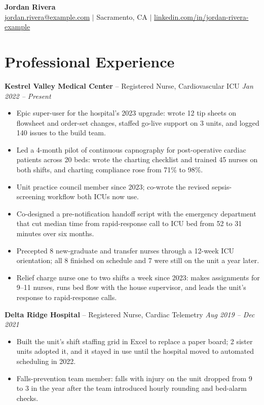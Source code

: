 \documentclass[11pt, letterpaper]{article}
\begin{document}
\pagestyle{empty}

\begin{center}
  \textbf{\LARGE Jordan Rivera} \\[2pt]
  \href{mailto:jordan.rivera@example.com}{jordan.rivera@example.com} $|$ Sacramento, CA $|$ \href{https://linkedin.com/in/jordan-rivera-example}{linkedin.com/in/jordan-rivera-example}
\end{center}
\vspace{-15pt}

\section{Professional Experience}

\textbf{Kestrel Valley Medical Center} -- {Registered Nurse, Cardiovascular ICU}
\hfill \textit{Jan 2022 – Present}
\begin{itemize}
  \item Epic super-user for the hospital's 2023 upgrade: wrote 12 tip sheets on flowsheet and order-set changes, staffed go-live support on 3 units, and logged 140 issues to the build team.
  \item Led a 4-month pilot of continuous capnography for post-operative cardiac patients across 20 beds: wrote the charting checklist and trained 45 nurses on both shifts, and charting compliance rose from 71\% to 98\%.
  \item Unit practice council member since 2023; co-wrote the revised sepsis-screening workflow both ICUs now use.
  \item Co-designed a pre-notification handoff script with the emergency department that cut median time from rapid-response call to ICU bed from 52 to 31 minutes over six months.
  \item Precepted 8 new-graduate and transfer nurses through a 12-week ICU orientation; all 8 finished on schedule and 7 were still on the unit a year later.
  \item Relief charge nurse one to two shifts a week since 2023: makes assignments for 9–11 nurses, runs bed flow with the house supervisor, and leads the unit's response to rapid-response calls.
\end{itemize}
\vspace{2pt}
\textbf{Delta Ridge Hospital} -- {Registered Nurse, Cardiac Telemetry}
\hfill \textit{Aug 2019 – Dec 2021}
\begin{itemize}
  \item Built the unit's shift staffing grid in Excel to replace a paper board; 2 sister units adopted it, and it stayed in use until the hospital moved to automated scheduling in 2022.
  \item Falls-prevention team member: falls with injury on the unit dropped from 9 to 3 in the year after the team introduced hourly rounding and bed-alarm checks.
\end{itemize}
\vspace{2pt}
\end{document}

